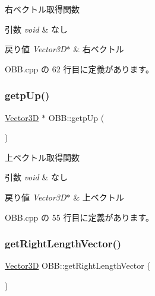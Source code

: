 右ベクトル取得関数 


\begin{DoxyParams}{引数}
{\em void} & なし \\
\hline
\end{DoxyParams}

\begin{DoxyRetVals}{戻り値}
{\em Vector3\+D$\ast$} & 右ベクトル \\
\hline
\end{DoxyRetVals}


 O\+B\+B.\+cpp の 62 行目に定義があります。

\mbox{\label{class_o_b_b_ac955d385e7348aae70f3bb2d3c6a48e9}} 
\subsubsection{\texorpdfstring{getp\+Up()}{getpUp()}}
{\footnotesize\ttfamily \mbox{\hyperlink{class_vector3_d}{Vector3D}} $\ast$ O\+B\+B\+::getp\+Up (\begin{DoxyParamCaption}{ }\end{DoxyParamCaption})}



上ベクトル取得関数 


\begin{DoxyParams}{引数}
{\em void} & なし \\
\hline
\end{DoxyParams}

\begin{DoxyRetVals}{戻り値}
{\em Vector3\+D$\ast$} & 上ベクトル \\
\hline
\end{DoxyRetVals}


 O\+B\+B.\+cpp の 55 行目に定義があります。

\mbox{\label{class_o_b_b_ac2cdb5afcc71053f5e6275bac95920bc}} 
\subsubsection{\texorpdfstring{get\+Right\+Length\+Vector()}{getRightLengthVector()}}
{\footnotesize\ttfamily \mbox{\hyperlink{class_vector3_d}{Vector3D}} O\+B\+B\+::get\+Right\+Length\+Vector (\begin{DoxyParamCaption}{ }\end{DoxyParamCaption})}



